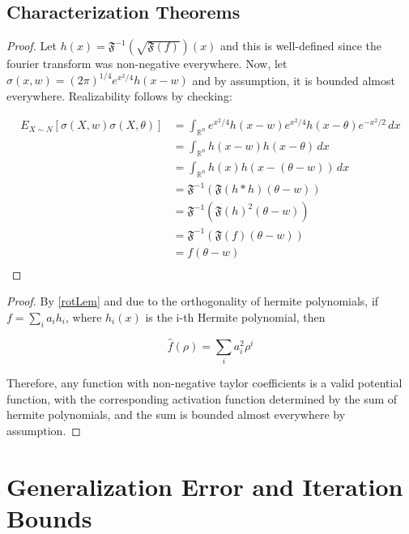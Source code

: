 \documentclass[11pt]{article}
\newcommand{\R}{{\mathbb{R}}}
\begin{document}
\subsection{Characterization Theorems}

\tranReal*

\begin{proof}
Let $h(x) = \mathfrak{F}^{-1}(\sqrt{\mathfrak{F}(f)})(x)$ and this is well-defined since the fourier transform was non-negative everywhere. Now, let $\sigma(x,w) = (2\pi)^{1/4}e^{x^2/4}h(x-w)$ and by assumption, it is bounded almost everywhere. Realizability follows by checking:

\begin{align*}
    E_{X \sim N}[\sigma(X,w)\sigma(X,\theta)] &= \int_{\R^n} e^{x^2/4}h(x-w)e^{x^2/4}h(x-\theta)e^{-x^2/2} \, dx \\
    &= \int_{\R^n} h(x-w)h(x-\theta) \, dx \\
    &= \int_{\R^n} h(x)h(x-(\theta-w)) \, dx \\
    &= \mathfrak{F}^{-1}(\mathfrak{F}(h\ast h)(\theta -w)) \\
    &= \mathfrak{F}^{-1}(\mathfrak{F}(h)^2(\theta - w)) \\
    &= \mathfrak{F}^{-1}(\mathfrak{F}(f)(\theta - w)) \\
    &= f(\theta - w) \\
\end{align*}



\end{proof}




\rotReal*

\begin{proof}
By \ref{rotLem} and due to the orthogonality of hermite polynomials, if $f = \sum_i a_i h_i$, where $h_i(x)$ is the i-th Hermite polynomial, then

\[\widehat{f}(\rho) = \sum_{i} a_i^2 \rho^i\]

Therefore, any function with non-negative taylor coefficients is a valid potential function, with the corresponding activation function determined by the sum of hermite polynomials, and the sum is bounded almost everywhere by assumption.
\end{proof}



\section{Generalization Error and Iteration Bounds}
\label{finite}
 
\end{document}
